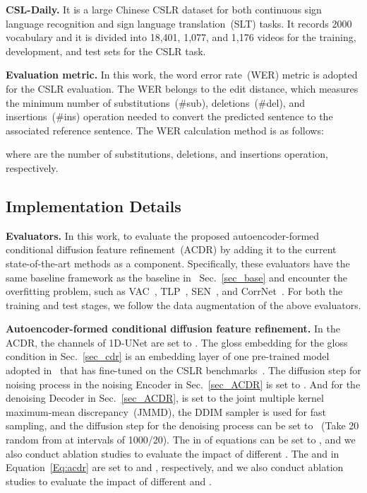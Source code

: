 \documentclass[sigconf]{acmart}
\begin{document}
\noindent\textbf{CSL-Daily\cite{zhou2021improving}.} It is a large Chinese CSLR dataset for both continuous sign language recognition and sign language translation~(SLT) tasks. 
It records 2000 vocabulary and it is divided into 18,401, 1,077, and 1,176 videos for the training, development, and  test sets for the CSLR task.

\noindent \textbf{Evaluation metric.} 
In this work, the word error rate~(WER) metric is adopted for the CSLR evaluation. The WER belongs to the edit distance, which measures the minimum number of substitutions~(\#sub), deletions~(\#del), and insertions~(\#ins) operation needed to convert the predicted sentence to the associated reference sentence. 
The WER calculation method is as follows:

\noindent where  are the number of substitutions, deletions, and insertions operation, respectively. 


\subsection{Implementation Details}

\noindent \textbf{Evaluators.}
In this work, to evaluate the proposed autoencoder-formed conditional diffusion feature refinement~(ACDR) by adding it 
to the current state-of-the-art methods as a component.
Specifically, these evaluators have the same baseline framework as the baseline in ~Sec.~\ref{sec_base} and encounter the overfitting problem, such as VAC~\cite{min2021visual}, TLP~\cite{hu2022temporal}, SEN~\cite{Hu2022SelfEmphasizingNF}, and  CorrNet~\cite{hu2023continuous}.
For both the training and test stages, we follow the data augmentation of the above evaluators.


\noindent \textbf{Autoencoder-formed conditional diffusion feature refinement.}
In the ACDR, the channels of 1D-UNet are set to  .
The gloss embedding for the gloss condition in Sec.~\ref{sec_cdr} is an embedding layer of one pre-trained model adopted in~\cite{chen2022simple} that has fine-tuned
on the CSLR benchmarks~\cite{koller2015continuous,camgoz2018neural,zhou2021improving}.
The diffusion step for noising process in the noising Encoder in Sec.~\ref{sec_ACDR} is set to .
And for the denoising Decoder in Sec.~\ref{sec_ACDR},  is set to the joint multiple kernel maximum-mean discrepancy~(JMMD), the DDIM sampler is used for fast sampling, and the diffusion step for the denoising process can be set to ~(Take 20 random  from  at intervals of 1000/20).
The  in  of equations can be set to , and we also conduct ablation studies to evaluate the impact of different .
The  and  in Equation~\ref{Eq:acdr} are set to  and , respectively, and we also conduct ablation studies to evaluate the impact of different  and .
\end{document}
